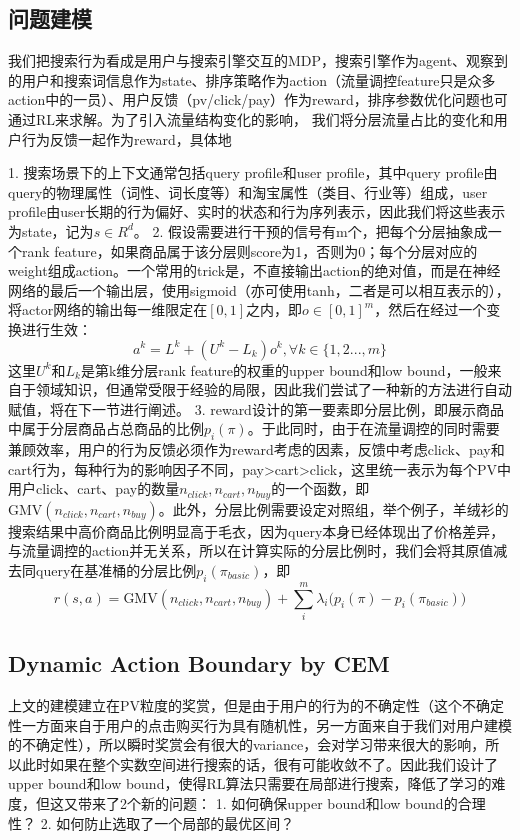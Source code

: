 \subsection{问题建模}
我们把搜索行为看成是用户与搜索引擎交互的MDP，搜索引擎作为agent、观察到的用户和搜索词信息作为state、排序策略作为action（流量调控feature只是众多action中的一员）、用户反馈（pv/click/pay）作为reward，排序参数优化问题也可通过RL来求解。为了引入流量结构变化的影响， 我们将分层流量占比的变化和用户行为反馈一起作为reward，具体地

1. 搜索场景下的上下文通常包括query profile和user profile，其中query profile由query的物理属性（词性、词长度等）和淘宝属性（类目、行业等）组成，user profile由user长期的行为偏好、实时的状态和行为序列表示，因此我们将这些表示为state，记为$s \in R^d$。
2. 假设需要进行干预的信号有m个，把每个分层抽象成一个rank feature，如果商品属于该分层则score为1，否则为0；每个分层对应的weight组成action。一个常用的trick是，不直接输出action的绝对值，而是在神经网络的最后一个输出层，使用sigmoid（亦可使用tanh，二者是可以相互表示的），将actor网络的输出每一维限定在$[0,1]$之内，即$o \in [0,1]^m$，然后在经过一个变换进行生效：
$$
a^k = L^k + (U^k-L_k)o^k, \forall{k} \in \{1,2...,m\}
$$
这里$U^k$和$L_k$是第k维分层rank feature的权重的upper bound和low bound，一般来自于领域知识，但通常受限于经验的局限，因此我们尝试了一种新的方法进行自动赋值，将在下一节进行阐述。
3. reward设计的第一要素即分层比例，即展示商品中属于分层商品占总商品的比例$p_i(\pi)$。于此同时，由于在流量调控的同时需要兼顾效率，用户的行为反馈必须作为reward考虑的因素，反馈中考虑click、pay和cart行为，每种行为的影响因子不同，pay>cart>click，这里统一表示为每个PV中用户click、cart、pay的数量$n_{click},n_{cart},n_{buy}$的一个函数，即$ \text{GMV}(n_{click},n_{cart},n_{buy})$。此外，分层比例需要设定对照组，举个例子，羊绒衫的搜索结果中高价商品比例明显高于毛衣，因为query本身已经体现出了价格差异，与流量调控的action并无关系，所以在计算实际的分层比例时，我们会将其原值减去同query在基准桶的分层比例$p_i(\pi_{basic})$，即
$$
r(s,a) = \text{GMV}(n_{click},n_{cart},n_{buy}) + \sum_i^m \lambda_i \big(p_i(\pi)-p_i(\pi_{basic})\big)
$$

\subsection{Dynamic Action Boundary by CEM}
上文的建模建立在PV粒度的奖赏，但是由于用户的行为的不确定性（这个不确定性一方面来自于用户的点击购买行为具有随机性，另一方面来自于我们对用户建模的不确定性），所以瞬时奖赏会有很大的variance，会对学习带来很大的影响，所以此时如果在整个实数空间进行搜索的话，很有可能收敛不了。因此我们设计了upper bound和low bound，使得RL算法只需要在局部进行搜索，降低了学习的难度，但这又带来了2个新的问题：
1. 如何确保upper bound和low bound的合理性？
2. 如何防止选取了一个局部的最优区间？

